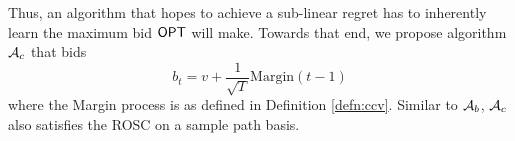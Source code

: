 Thus, an algorithm that hopes to achieve a sub-linear regret has 
to inherently learn the maximum bid $\mathsf{OPT}$ will make.
Towards that end, we propose algorithm $\mathcal{A}_c$ that bids
 \begin{equation}\label{eq:bidprocess}
b_t = v+ \frac{1}{\sqrt{T}}\text{Margin}(t-1)
\end{equation}
 where the Margin process is as defined in Definition \ref{defn:ccv}.
Similar to $\mathcal{A}_b$, $\mathcal{A}_c$ also satisfies the ROSC  on a sample path basis.


